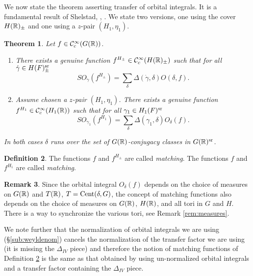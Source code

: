\documentclass{article}
\newtheorem{thm}{Theorem}[subsection]
\theoremstyle{definition}
\newtheorem{dfn}[thm]{Definition}
\newtheorem{rem}[thm]{Remark}
\numberwithin{equation}{section}
\renewcommand{\-}{\hyp{}}
\begin{document}
We now state the theorem asserting transfer of orbital integrals. It is a fundamental result of Shelstad, \cite{She82}, \cite{SheTE1}. We state two versions, one using the cover $H(\mathbb{R})_\pm$ and one using a $z$-pair $(H_1,\eta_1)$. 

\begin{thm} \label{thm:orbtrans}
Let $f \in \mathcal{C}_c^\infty(G(\mathbb{R}))$.
\begin{enumerate}
	\item There exists a genuine function $f^{H_\pm} \in \mathcal{C}_c^\infty(H(\mathbb{R})_\pm)$ such that for all $\dot\gamma \in H(F)_\pm^{\textrm{sr}}$
	\[ SO_{\dot\gamma}(f^{H_\pm}) = \sum_\delta \Delta(\dot\gamma,\delta) O(\delta,f). \]
	\item Assume chosen a $z$-pair $(H_1,\eta_1)$. There exists a genuine function $f^{H_1} \in \mathcal{C}_c^\infty(H_1(\mathbb{R}))$ such that for all $\gamma_1 \in H_1(F)^{\textrm{sr}}$
	\[ SO_{\gamma_1}(f^{H_1}) = \sum_\delta \Delta(\gamma_1,\delta) O_\delta(f). \]
\end{enumerate}
In both cases $\delta$ runs over the set of $G(\mathbb{R})$-conjugacy classes in $G(\mathbb{R})^{\textrm{sr}}$.
\end{thm}

\begin{dfn} \label{dfn:matching}
The functions $f$ and $f^{H_\pm}$ are called \emph{matching}. The functions $f$ and $f^{H_1}$ are called \emph{matching}.
\end{dfn}

\begin{rem} \label{rem:matchmeasures}
	Since the orbital integral $O_\delta(f)$ depends on the choice of measures on $G(\mathbb{R})$ and $T(\mathbb{R})$, $T=\textrm{Cent}(\delta,G)$, the concept of matching functions also depends on the choice of measures on $G(\mathbb{R})$, $H(\mathbb{R})$, and all tori in $G$ and $H$. There is a way to synchronize the various tori, see Remark \ref{rem:measures}.

	We note further that the normalization of orbital integrals we are using (\S\ref{sub:weyldenom}) cancels the normalization of the transfer factor we are using (it is missing the $\Delta_{IV}$ piece) and therefore the notion of matching functions of Definition \ref{dfn:matching} is the same as that obtained by using un-normalized orbital integrals and a transfer factor containing the $\Delta_{IV}$ piece.
\end{rem}
\end{document}
